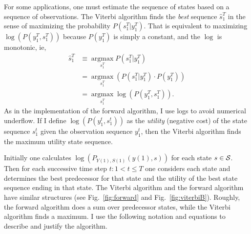\documentclass[]{article}
\newcommand{\ts}[3]{#1_{#2}^{#3}}                    %
\newcommand{\argmax}{\operatorname*{argmax}}
\newcommand{\ti}[2]{{#1}{(#2)}}                  %
\newcommand{\states}{{\cal{S}}}
\begin{document}
For some applications, one must estimate the sequence of states based
on a sequence of observations.  The Viterbi algorithm finds the \emph{best} sequence $\ts{\hat s}{1}{T}$
in the sense of maximizing the probability
$P\left( \ts{s}{1}{T}|\ts{y}{1}{T} \right)$.  That is equivalent to
maximizing
$\log \left( P\left( \ts{y}{1}{T},\ts{s}{1}{T} \right) \right)$
because $P \left( \ts{y}{1}{T} \right)$ is simply a constant, and the
$\log$ is monotonic, ie,
\begin{align*}
  \ts{\hat s}{1}{T} &\equiv \argmax_{\ts{s}{1}{T}}
  P(\ts{s}{1}{T}|\ts{y}{1}{T})\\
  &= \argmax_{\ts{s}{1}{T}} \left( P(\ts{s}{1}{T}|\ts{y}{1}{T}) \cdot
    P(\ts{y}{1}{T}) \right)\\
  &= \argmax_{\ts{s}{1}{T}} \log \left( P(\ts{y}{1}{T},\ts{s}{1}{T})
  \right).
\end{align*}
As in the implementation of the forward algorithm, I use logs to
avoid numerical underflow.  If I define $\log \left( P\left(
    \ts{y}{1}{t}, \ts{s}{1}{t} \right) \right)$ as the
\emph{utility} (negative cost) of the state sequence $\ts{s}{1}{t}$
given the observation sequence $\ts{y}{1}{t}$, then the Viterbi
algorithm finds the maximum utility state sequence.

Initially one calculates $\log\left(P_{\ti{Y}{1},\ti{S}{1}}
  \left(\ti{y}{1}, s \right) \right)$ for each state $s \in
\states$.  Then for each successive time step $t: 1 < t \leq T$ one
considers each state and determines the best predecessor for that
state and the utility of the best state sequence ending in that state.
The Viterbi algorithm and the forward algorithm have similar
structures (see Fig.~\ref{fig:forward} and Fig.~\ref{fig:viterbiB}).
Roughly, the forward algorithm does a sum over predecessor states,
while the Viterbi algorithm finds a maximum. I use the following
notation and equations to describe and justify the algorithm.
\end{document}

